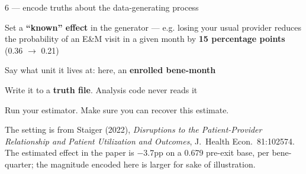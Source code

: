 \documentclass[notes,11pt, aspectratio=169, xcolor={table}]{beamer}
\newenvironment{wideitemize}{\itemize\addtolength{\itemsep}{3pt}}{\enditemize}
\begin{document}
\begin{frame}{6 --- encode truths about the data-generating process}

\begin{wideitemize}
\item Set a \textbf{``known'' effect} in the generator --- e.g. losing your usual provider
      reduces the probability of an E\&M visit in a given month by \textbf{15 percentage
      points} (0.36 $\rightarrow$ 0.21)
\item Say what unit it lives at: here, an \textbf{enrolled bene-month}
\item Write it to a \textbf{truth file}. {\color{red}Analysis code never reads it}
\item Run your estimator. Make sure you can recover this estimate.
\end{wideitemize}

\vspace{1.2em}
\begin{center}
\begin{minipage}{0.88\textwidth}
\footnotesize The setting is from Staiger (2022), \emph{Disruptions to the Patient-Provider
Relationship and Patient Utilization and Outcomes}, J.\ Health Econ.\ 81:102574. The estimated effect in the paper is $-$3.7pp on a 0.679 pre-exit base, per bene-quarter; the magnitude encoded
here is larger for sake of illustration.
\end{minipage}
\end{center}

\end{frame}
\end{document}
